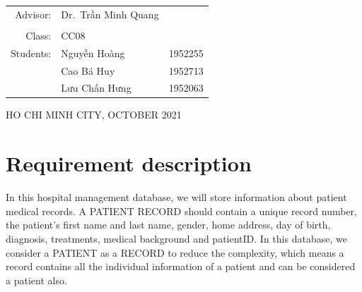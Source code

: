 \documentclass[a4paper]{article}
\numberwithin{equation}{section}
\begin{document}
\begin{titlepage}
  \begin{table}[h]
    \begin{tabular}{rll}
      \hspace{5cm} Advisor:  & Dr.\ Trần Minh Quang           \\
                             &                                \\
      \hspace{5cm} Class:    & CC08                           \\
      \hspace{5cm} Students: & Nguyễn Hoàng         & 1952255 \\
                             & Cao Bá Huy           & 1952713 \\
                             & Lưu Chấn Hưng        & 1952063
    \end{tabular}
  \end{table}

  \begin{center}
    {\footnotesize \large HO CHI MINH CITY, OCTOBER 2021}
  \end{center}
\end{titlepage}


\newpage
\tableofcontents
\newpage


\section{Requirement description}

In this hospital management database, we will store information about patient medical records.
A PATIENT RECORD should contain a unique record number, the patient's first name and last name, gender, home address, day of birth, diagnosis, treatments, medical background and patientID\@.
In this database, we consider a PATIENT as a RECORD to reduce the complexity, which means a record contains all the individual information of a patient and can be considered a patient also.
\end{document}
